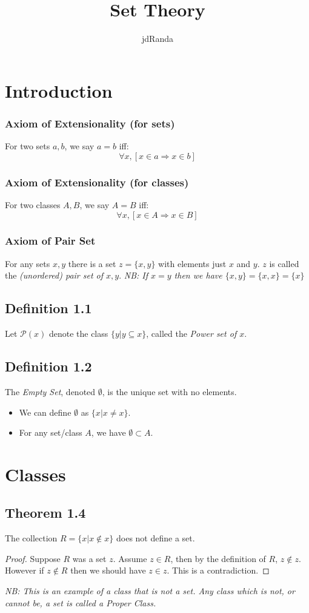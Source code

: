 \documentclass[a4paper, 12pt, twoside]{article}
\author{jdRanda}
\title{Set Theory}
\begin{document}
\maketitle
\newpage
\section{Introduction}
\subsubsection*{Axiom of Extensionality (for sets)}
For two sets $a,b$, we say $a=b$ iff:
$$ \forall x,[x\in a\Rightarrow x\in b]$$
\subsubsection*{Axiom of Extensionality (for classes)}
For two classes $A,B$, we say $A=B$ iff:
$$ \forall x,[x\in A\Rightarrow x\in B]$$
\subsubsection*{Axiom of Pair Set}
For any sets $x,y$ there is a set $z=\{x,y\}$ with elements just $x$ and $y$. $z$ is called the \emph{(unordered) pair set of $x,y$}.
\textit{NB: If $x=y$ then we have $\{x,y\}=\{x,x\}=\{x\}$}
\subsection*{Definition 1.1}
Let $\mathcal{P}(x)$ denote the class $\{y|y\subseteq x\}$, called the \emph{Power set of $x$}.
\subsection*{Definition 1.2}
The \emph{Empty Set}, denoted $\emptyset$, is the unique set with no elements.
\begin{itemize}
    \item We can define $\emptyset$ as $\{x|x\neq x\}$.
    \item For any set/class $A$, we have $\emptyset \subset A$.
\end{itemize}

\newpage
\section{Classes}
\subsection*{Theorem 1.4}
The collection $R=\{x|x\notin x\}$ does not define a set.\\
\begin{proof}
    Suppose $R$ was a set $z$. Assume $z\in R$, then by the definition of $R$, $z \notin z$. However if $z \notin R$ then we should have $z \in z$. This is a contradiction.
\end{proof}
\textit{NB: This is an example of a class that is not a set. Any class which is not, or cannot be, a set is called a \emph{Proper Class}.}
\end{document}
